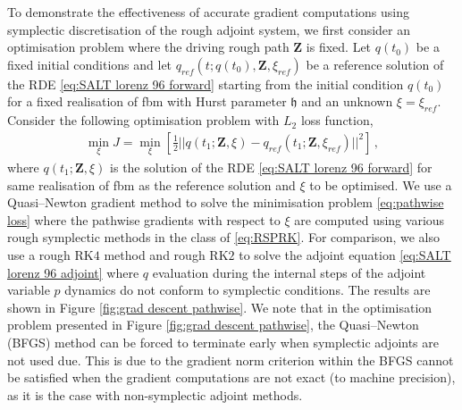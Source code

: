 \documentclass[11pt, oneside]{article}
\numberwithin{equation}{section}
\theoremstyle{definition}
\begin{document}
To demonstrate the effectiveness of accurate gradient computations using symplectic discretisation of the rough adjoint system, we first consider an optimisation problem where the driving rough path $\mathbf{Z}$ is fixed. Let $q(t_0)$ be a fixed initial conditions and let $q_{ref}(t; q(t_0), \mathbf{Z}, \xi_{ref})$ be a reference solution of the RDE \eqref{eq:SALT lorenz 96 forward} starting from the initial condition $q(t_0)$ for a fixed realisation of fbm with Hurst parameter $\mathfrak{h}$ and an unknown $\xi = \xi_{ref}$. Consider the following optimisation problem with $L_2$ loss function,
\begin{align}
    \min_{\xi} J = \min_{\xi}\left[\frac{1}{2}|| q(t_1; \mathbf{Z},\xi) - q_{ref}(t_1; \mathbf{Z}, \xi_{ref}) ||^2 \right]\,,\label{eq:pathwise loss}
\end{align}
where $q(t_1; \mathbf{Z},\xi)$ is the solution of the RDE \eqref{eq:SALT lorenz 96 forward} for same realisation of fbm as the reference solution and $\xi$ to be optimised. We use a Quasi--Newton gradient method to solve the minimisation problem \eqref{eq:pathwise loss} where the pathwise gradients with respect to $\xi$ are computed using various rough symplectic methods in the class of \eqref{eq:RSPRK}. For comparison, we also use a rough RK$4$ method and rough RK$2$ to solve the adjoint equation \eqref{eq:SALT lorenz 96 adjoint} where $q$ evaluation during the internal steps of the adjoint variable $p$ dynamics do not conform to symplectic conditions. The results are shown in Figure \ref{fig:grad descent pathwise}. We note that in the optimisation problem presented in Figure \ref{fig:grad descent pathwise}, the Quasi--Newton (BFGS) method can be forced to terminate early when symplectic adjoints are not used due. This is due to the gradient norm criterion within the BFGS cannot be satisfied when the gradient computations are not exact (to machine precision), as it is the case with non-symplectic adjoint methods.
\end{document}
